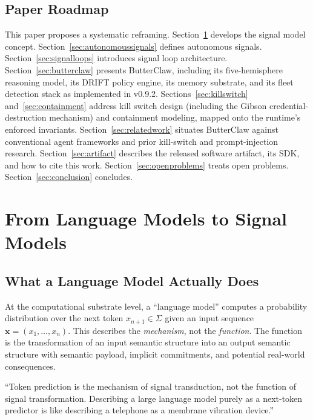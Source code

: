 \documentclass[11pt,a4paper]{article}
\begin{document}
\subsection{Paper Roadmap}

This paper proposes a systematic reframing. Section~\ref{sec:signalmodels} develops the signal
model concept. Section~\ref{sec:autonomoussignals} defines autonomous signals.
Section~\ref{sec:signalloops} introduces signal loop architecture.
Section~\ref{sec:butterclaw} presents ButterClaw, including its five-hemisphere reasoning model,
its DRIFT policy engine, its memory substrate, and its fleet detection stack as implemented in
v0.9.2. Sections~\ref{sec:killswitch} and~\ref{sec:containment} address kill switch design
(including the Gibson credential-destruction mechanism) and containment modeling, mapped onto the
runtime's enforced invariants. Section~\ref{sec:relatedwork} situates ButterClaw against
conventional agent frameworks and prior kill-switch and prompt-injection research.
Section~\ref{sec:artifact} describes the released software artifact, its SDK, and how to cite
this work. Section~\ref{sec:openproblems} treats open problems. Section~\ref{sec:conclusion}
concludes.

\section{From Language Models to Signal Models}
\label{sec:signalmodels}

\subsection{What a Language Model Actually Does}

At the computational substrate level, a ``language model'' computes a probability distribution
over the next token $x_{n+1} \in \Sigma$ given an input sequence
$\mathbf{x} = (x_1, \ldots, x_n)$. This describes the \emph{mechanism}, not the
\emph{function}. The function is the transformation of an input semantic structure into an output
semantic structure with semantic payload, implicit commitments, and potential real-world
consequences.

\begin{pullquotebox}
``Token prediction is the mechanism of signal transduction, not the function of signal
transformation. Describing a large language model purely as a next-token predictor is like
describing a telephone as a membrane vibration device.''
\end{pullquotebox}
\end{document}
